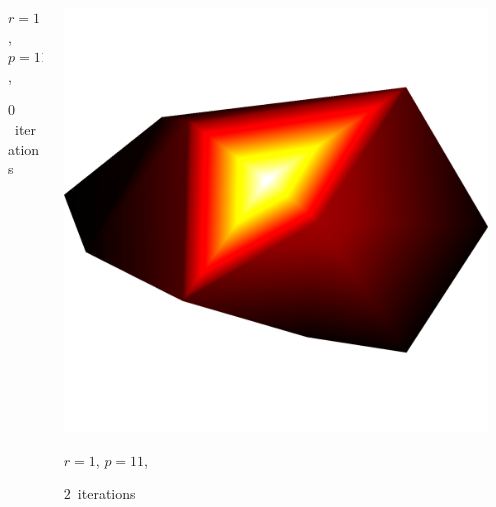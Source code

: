 \documentclass[aspectratio=169,t]{beamer}
\begin{document}
{\begin{columns}
\begin{column}{0.22\textwidth}
			{\footnotesize
				\par \vspace{-1mm} $r=1$, $p=11$,
				\par \vspace{-1mm} $0$~iterations
			}
		\end{column}
		\begin{column}{0.22\textwidth}
			\centering
			\includegraphics[width=.85\textwidth]{data/synthetic_meshes/random_circle_tessellation_Dirac_delta_1_v11_f12_funcvals_2iter.png}
			{\footnotesize
				\par \vspace{-1mm} $r=1$, $p=11$,
				\par \vspace{-1mm} $2$~iterations
			}
		\end{column}
		\begin{column}{0.17\textwidth}~\end{column}
	\end{columns}
	\vspace*{4mm}
	\begin{columns}
		\begin{column}{0.17\textwidth}~\end{column}
		\begin{column}{0.22\textwidth}
			\centering

\end{column}
\end{columns}}
\end{document}
